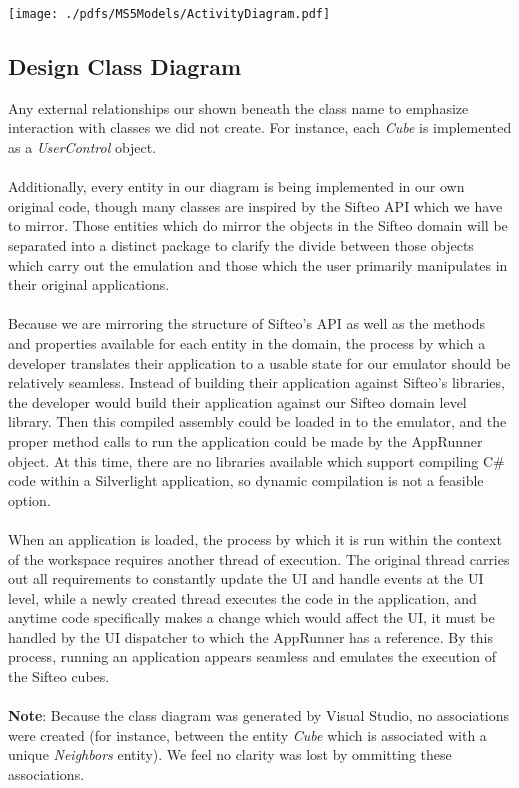 \documentclass[12pt]{article}
\begin{document}
\begin{center}
        \texttt{[image: ./pdfs/MS5Models/ActivityDiagram.pdf]}
\end{center}

\subsection{Design Class Diagram}
Any external relationships our shown beneath the class name to emphasize interaction with classes we did not create. For instance, each \textit{Cube} is implemented as a \textit{UserControl} object.
\\\\
Additionally, every entity in our diagram is being implemented in our own original code, though many classes are inspired by the Sifteo API which we have to mirror. Those entities which do mirror the objects in the Sifteo domain will be separated into a distinct package to clarify the divide between those objects which carry out the emulation and those which the user primarily manipulates in their original applications.
\\\\
Because we are mirroring the structure of Sifteo's API as well as the methods and properties available for each entity in the domain, the process by which a developer translates their application to a usable state for our emulator should be relatively seamless. Instead of building their application against Sifteo's libraries, the developer would build their application against our Sifteo domain level library. Then this compiled assembly could be loaded in to the emulator, and the proper method calls to run the application could be made by the AppRunner object. At this time, there are no libraries available which support compiling C\# code within a Silverlight application, so dynamic compilation is not a feasible option.
\\\\
When an application is loaded, the process by which it is run within the context of the workspace requires another thread of execution. The original thread carries out all requirements to constantly update the UI and handle events at the UI level, while a newly created thread executes the code in the application, and anytime code specifically makes a change which would affect the UI, it must be handled by the UI dispatcher to which the AppRunner has a reference. By this process, running an application appears seamless and emulates the execution of the Sifteo cubes.
\\\\
\textbf{Note}: Because the class diagram was generated by Visual Studio, no associations were created (for instance, between the entity \textit{Cube} which is associated with a unique \textit{Neighbors} entity). We feel no clarity was lost by ommitting these associations.
\end{document}
